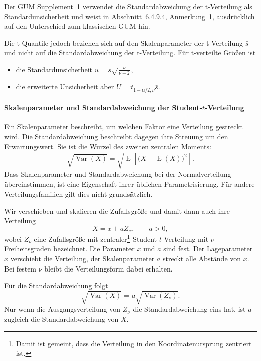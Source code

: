 Der GUM Supplement~1 \cite{GUMS1} verwendet die Standardabweichung der t-Verteilung als Standardunsicherheit und weist in Abschnitt~6.4.9.4, Anmerkung~1, ausdrücklich auf den Unterschied zum klassischen GUM \cite{GUM95} hin.

Die t-Quantile jedoch beziehen sich auf den Skalenparameter der t-Verteilung $\bar s$ und nicht auf die Standardabweichung der t-Verteilung. Für t-verteilte Größen ist
\begin{itemize}
  \item die Standardunsicherheit $u = \bar s \sqrt{\frac{\nu}{\nu - 2}}$,
  \item die erweiterte Unsicherheit aber $U = t_{1-\alpha/2,\nu} \bar s$.
\end{itemize}

\paragraph{Skalenparameter und Standardabweichung der
Student-\texorpdfstring{$t$}{t}-Verteilung}

Ein Skalenparameter beschreibt, um welchen Faktor eine Verteilung
gestreckt wird. Die Standardabweichung beschreibt dagegen ihre
Streuung um den Erwartungswert. Sie ist die Wurzel des zweiten
zentralen Moments:
\begin{equation}
\sqrt{\operatorname{Var}(X)}
=
\sqrt{\operatorname E\!\left[
\bigl(X-\operatorname E(X)\bigr)^2
\right]}.
\end{equation}
Dass Skalenparameter und Standardabweichung bei der Normalverteilung
übereinstimmen, ist eine Eigenschaft ihrer üblichen Parametrisierung.
Für andere Verteilungsfamilien gilt dies nicht grundsätzlich.

Wir verschieben und skalieren die Zufallsgröße und damit dann auch ihre Verteilung
\begin{equation}
X=x+aZ_\nu,
\qquad a>0,
\end{equation}
wobei $Z_\nu$ eine Zufallsgröße mit zentraler\footnote{Damit ist gemeint, dass die Verteilung in den Koordinatenursprung zentriert ist.}
Student-$t$-Verteilung mit $\nu$ Freiheitsgraden bezeichnet.
Die Parameter $x$ und $a$ sind fest.
Der Lageparameter $x$ verschiebt die Verteilung,
der Skalenparameter $a$ streckt alle Abstände von $x$.
Bei festem $\nu$ bleibt die Verteilungsform dabei erhalten.

Für die Standardabweichung folgt
\begin{equation}
\sqrt{\operatorname{Var}(X)}
=
a\sqrt{\operatorname{Var}(Z_\nu)}.
\end{equation}
Nur wenn die Ausgangsverteilung von $Z_\nu$ die Standardabweichung
eins hat, ist $a$ zugleich die Standardabweichung von $X$.

